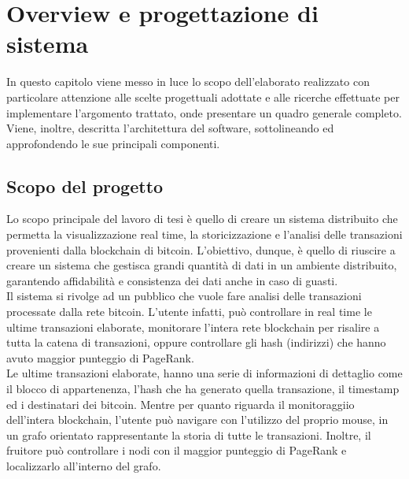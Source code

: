\chapter{Overview e progettazione di sistema}
\label{chap:overview e progettazione di sistema}
In questo capitolo viene messo in luce lo scopo dell'elaborato realizzato con particolare attenzione alle scelte progettuali adottate e alle ricerche effettuate per implementare l'argomento trattato, onde presentare un quadro generale completo. Viene, inoltre, descritta l'architettura del software, sottolineando ed approfondendo le sue principali componenti.

\section{Scopo del progetto}
\label{sec:scopo del progetto}
Lo scopo principale del lavoro di tesi è quello di creare un sistema distribuito che permetta la visualizzazione real time, la storicizzazione e l'analisi delle transazioni  provenienti dalla blockchain di bitcoin. L'obiettivo, dunque, è quello di riuscire a creare un sistema che gestisca grandi quantità di dati in un ambiente distribuito, garantendo affidabilità e consistenza dei dati anche in caso di guasti.
\\Il sistema si rivolge ad un pubblico che vuole fare analisi delle transazioni processate dalla rete bitcoin. L'utente infatti, può controllare in real time le ultime transazioni elaborate, monitorare l'intera rete blockchain per risalire a tutta la catena di transazioni, oppure controllare gli hash (indirizzi) che hanno avuto maggior punteggio di PageRank.
\\Le ultime transazioni elaborate, hanno una serie di informazioni di dettaglio come il blocco di appartenenza, l'hash che ha generato quella transazione, il timestamp ed i destinatari dei bitcoin. Mentre per quanto riguarda il monitoraggiio dell'intera blockchain, l'utente può navigare con l'utilizzo del proprio mouse, in un grafo orientato rappresentante la storia di tutte le transazioni. Inoltre, il fruitore può controllare i nodi con il maggior punteggio di PageRank e localizzarlo all'interno del grafo.  

